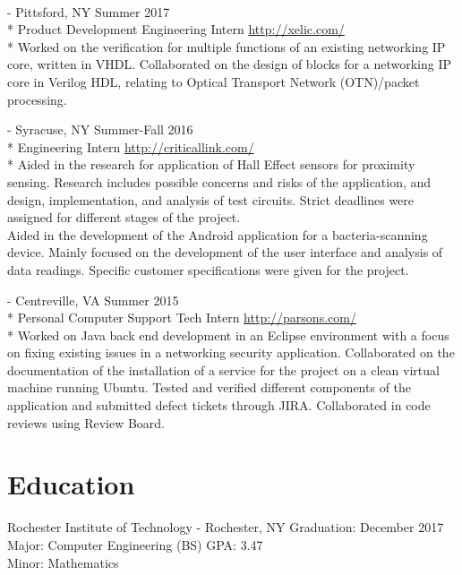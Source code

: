 \documentclass[a4paper,margin,line]{resume}
\newcommand{\rurl}[1]{\hfill {\footnotesize \url{#1}}}
\newcommand{\rdate}[1]{\hfill {\small #1}}
\renewcommand{\employer}[5]{ \item[#1] - #2 \rdate{#3} \\* #4 \rurl{#5} \\*}
\begin{document}
\begin{resume}
\begin{asparadesc}
        \\
        \employer{Xelic, Inc.}{Pittsford, NY}{Summer 2017}{Product Development Engineering Intern}
        {http://xelic.com/}
        \small Worked on the verification for multiple functions of an existing networking IP core, written in VHDL. Collaborated on the design of blocks for a networking IP core in Verilog HDL, relating to Optical Transport Network (OTN)/packet processing.
        \\
        \employer{Critical Link LLC}{Syracuse, NY}{Summer-Fall 2016}{Engineering Intern}
        {http://criticallink.com/}
        \small
        Aided in the research for application of Hall Effect sensors for proximity sensing. 
        Research includes possible concerns and risks of the application, and design, implementation, and analysis of 
        test circuits. Strict deadlines were assigned for different stages of the project.\smallskip\\
        Aided in the development of the Android application for a bacteria-scanning device. Mainly focused on the development of the user 
        interface and analysis of data readings. Specific customer specifications were given for the project. 
        \\
        \employer{Parsons Government Services}{Centreville, VA}{Summer 2015}{Personal Computer Support Tech Intern}
        {http://parsons.com/}
        \small
        Worked on Java back end development in an Eclipse environment with a focus on fixing existing 
        issues in a networking security application. Collaborated on the documentation of the installation 
        of a service for the project on a clean virtual machine running Ubuntu. Tested and verified 
        different components of the application and submitted defect tickets through JIRA. Collaborated 
        in code reviews using Review Board.
        \normalsize
        
    \end{asparadesc}


\section{\mysidestyle Education}
    \begin{compactdesc}
        \item[Rochester Institute of Technology] - Rochester, NY \rdate{Graduation: December 2017} \\
            Major: Computer Engineering (BS) \rdate{GPA: 3.47}\\
            Minor: Mathematics
    \end{compactdesc}



\end{resume}
\end{document}
